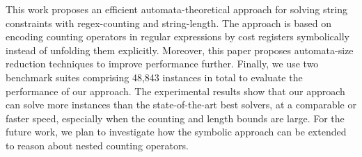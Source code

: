 %

This work proposes an efficient automata-theoretical approach for solving string constraints with regex-counting and string-length. The approach is based on encoding counting operators in regular expressions by cost registers symbolically instead of unfolding them explicitly. Moreover, this paper proposes automata-size reduction techniques to improve performance further. Finally, we use two benchmark suites comprising 48,843 instances in total to evaluate the performance of our approach. The experimental results show that our approach can solve more instances than the state-of-the-art best solvers, at a comparable or faster speed, especially when the counting and length bounds are large. 
For the future work, we plan to investigate how the symbolic approach can be extended to reason about nested counting operators. 




%